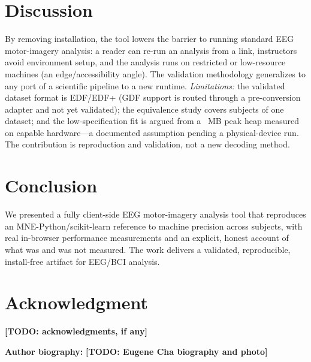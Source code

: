 \documentclass[journal]{IEEEtran}
\newcommand{\todo}[1]{\textbf{[TODO: #1]}}
\begin{document}
\section{Discussion}
By removing installation, the tool lowers the barrier to running standard EEG motor-imagery analysis:
a reader can re-run an analysis from a link, instructors avoid environment setup, and the analysis
runs on restricted or low-resource machines (an edge/accessibility angle). The validation
methodology generalizes to any port of a scientific pipeline to a new runtime. \emph{Limitations:}
the validated dataset format is EDF/EDF+ (GDF support is routed through a pre-conversion adapter and
not yet validated); the equivalence study covers \Nsubjects{} subjects of one dataset; and the
low-specification fit is argued from a \PeakHeap~MB peak heap measured on capable hardware---a
documented assumption pending a physical-device run. The contribution is reproduction and validation,
not a new decoding method.

\section{Conclusion}
We presented a fully client-side EEG motor-imagery analysis tool that reproduces an
MNE-Python/scikit-learn reference to machine precision across \Nsubjects{} subjects, with real
in-browser performance measurements and an explicit, honest account of what was and was not measured.
The work delivers a validated, reproducible, install-free artifact for EEG/BCI analysis.

\section*{Acknowledgment}
\todo{acknowledgments, if any}




\vspace{6pt}
\noindent\textbf{Author biography:} \todo{Eugene Cha biography and photo}
\end{document}
